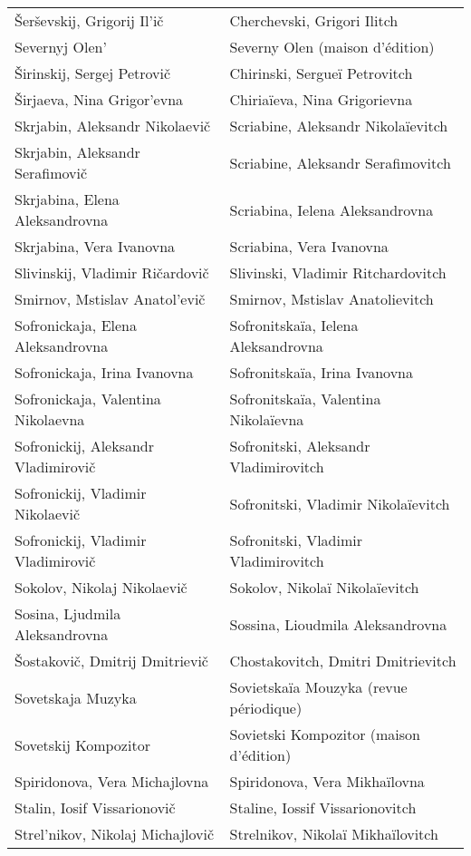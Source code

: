 {\begin{longtable}[c]{ll}
 Šerševskij, Grigorij Il'ič
 & Cherchevski, Grigori Ilitch
 \\
 Severnyj Olen'
 & Severny Olen (maison d'édition)
 \\
 Širinskij, Sergej Petrovič
 & Chirinski, Sergueï Petrovitch
 \\
 Širjaeva, Nina Grigor'evna
 & Chiriaïeva, Nina Grigorievna
 \\
 Skrjabin, Aleksandr Nikolaevič
 & Scriabine, Aleksandr Nikolaïevitch
 \\
 Skrjabin, Aleksandr Serafimovič
 & Scriabine, Aleksandr Serafimovitch
 \\
 Skrjabina, Elena Aleksandrovna
 & Scriabina, Ielena Aleksandrovna
 \\
 Skrjabina, Vera Ivanovna
 & Scriabina, Vera Ivanovna
 \\
 Slivinskij, Vladimir Ričardovič
 & Slivinski, Vladimir Ritchardovitch
 \\
 Smirnov, Mstislav Anatol'evič
 & Smirnov, Mstislav Anatolievitch
 \\
 Sofronickaja, Elena Aleksandrovna
 & Sofronitskaïa, Ielena Aleksandrovna
 \\
 Sofronickaja, Irina Ivanovna
 & Sofronitskaïa, Irina Ivanovna
 \\
 Sofronickaja, Valentina Nikolaevna
 & Sofronitskaïa, Valentina Nikolaïevna
 \\
 Sofronickij, Aleksandr Vladimirovič
 & Sofronitski, Aleksandr Vladimirovitch
 \\
 Sofronickij, Vladimir Nikolaevič
 & Sofronitski, Vladimir Nikolaïevitch
 \\
 Sofronickij, Vladimir Vladimirovič
 & Sofronitski, Vladimir Vladimirovitch
 \\
 Sokolov, Nikolaj Nikolaevič
 & Sokolov, Nikolaï Nikolaïevitch
 \\
 Sosina, Ljudmila Aleksandrovna
 & Sossina, Lioudmila Aleksandrovna
 \\
 Šostakovič, Dmitrij Dmitrievič
 & Chostakovitch, Dmitri Dmitrievitch
 \\
 Sovetskaja Muzyka
 & Sovietskaïa Mouzyka (revue périodique)
 \\
 Sovetskij Kompozitor
 & Sovietski Kompozitor (maison d'édition)
 \\
 Spiridonova, Vera Michajlovna
 & Spiridonova, Vera Mikhaïlovna
 \\
 Stalin, Iosif Vissarionovič
 & Staline, Iossif Vissarionovitch
 \\
 Strel'nikov, Nikolaj Michajlovič
 & Strelnikov, Nikolaï Mikhaïlovitch

\end{longtable}}
